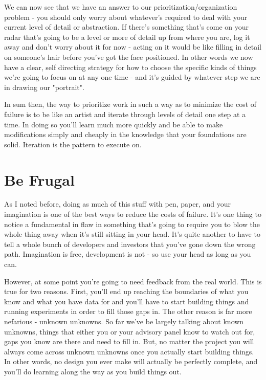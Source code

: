 \documentclass[11pt,a5paper]{book}
\begin{document}
We can now see that we have an answer to our prioritization/organization problem - you should only worry about whatever's required to deal with your current level of detail or abstraction. If there's something that's come on your radar that's going to be a level or more of detail up from where you are, log it away and don't worry about it for now - acting on it would be like filling in detail on someone's hair before you've got the face positioned. In other words we now have a clear, self directing strategy for how to choose the specific kinds of things we're going to focus on at any one time - and it's guided by whatever step we are in drawing our "portrait". 
\newline

In sum then, the way to prioritize work in such a way as to minimize the cost of failure is to be like an artist and iterate through levels of detail one step at a time. In doing so you'll learn much more quickly and be able to make modifications simply and cheaply in the knowledge that your foundations are solid. Iteration is the pattern to execute on.

\section{Be Frugal}
As I noted before, doing as much of this stuff with pen, paper, and your imagination is one of the best ways to reduce the costs of failure. It's one thing to notice a fundamental in flaw in something that's going to require you to blow the whole thing away when it's still sitting in your head. It's quite another to have to tell a whole bunch of developers and investors that you've gone down the wrong path. Imagination is free, development is not - so use your head as long as you can.
\newline

However, at some point you're going to need feedback from the real world. This is true for two reasons. First, you'll end up reaching the boundaries of what you know and what you have data for and you'll have to start building things and running experiments in order to fill those gaps in. The other reason is far more nefarious - unknown unknowns. So far we've be largely talking about known unknowns, things that either you or your advisory panel know to watch out for, gaps you know are there and need to fill in. But, no matter the project you will always come across unknown unknowns once you actually start building things. In other words, no design you ever make will actually be perfectly complete, and you'll do learning along the way as you build things out. 
\newline
\end{document}
